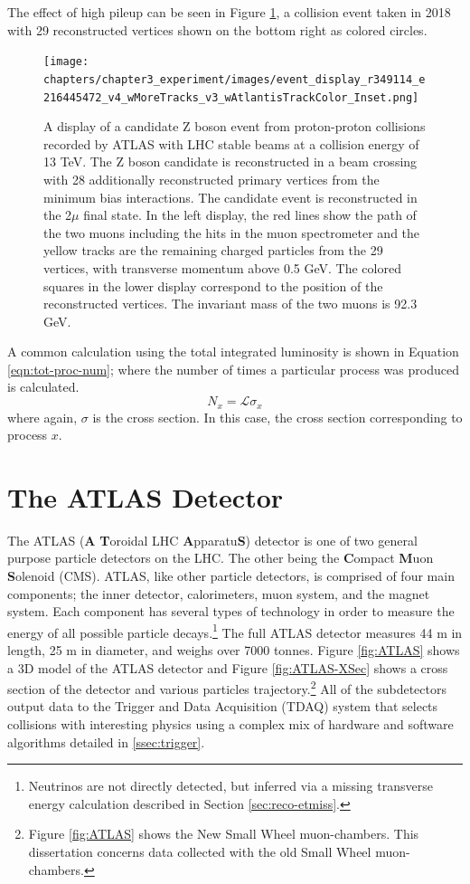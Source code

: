 		The effect of high pileup can be seen in Figure \ref{fig:high-pileup-event-display}, a collision event taken in 2018 with 29 reconstructed vertices shown on the bottom right as colored circles.
		\begin{figure}[!ht]
		\centering
		\texttt{[image: chapters/chapter3\_experiment/images/event\_display\_r349114\_e216445472\_v4\_wMoreTracks\_v3\_wAtlantisTrackColor\_Inset.png]}
		\caption{ A display of a candidate Z boson event from proton-proton collisions recorded by ATLAS with LHC stable beams at a collision energy of 13 TeV. The Z boson candidate is reconstructed in a beam crossing with 28 additionally reconstructed primary vertices from the minimum bias interactions. The candidate event is reconstructed in the 2$\mu$ final state. In the left display, the red lines show the path of the two muons including the hits in the muon spectrometer and the yellow tracks are the remaining charged particles from the 29 vertices, with transverse momentum above 0.5 GeV. The colored squares in the lower display correspond to the position of the reconstructed vertices. The invariant mass of the two muons is 92.3 GeV. }
		\label{fig:high-pileup-event-display}
		\end{figure}


		A common calculation using the total integrated luminosity is shown in Equation \ref{eqn:tot-proc-num}; where the number of times a particular process was produced is calculated.
		\begin{equation}\label{eqn:tot-proc-num}
		N_{x} = \mathcal{L} \sigma_{x}
		\end{equation}
		where again, $\sigma$ is the cross section. In this case, the cross section corresponding to process $x$.


\section{The ATLAS Detector}\label{sec:ATLAS}
	The ATLAS (\textbf{A} \textbf{T}oroidal LHC \textbf{A}pparatu\textbf{S}) detector is one of two general purpose particle detectors on the LHC. The other being the \textbf{C}ompact \textbf{M}uon \textbf{S}olenoid (CMS). ATLAS, like other particle detectors, is comprised of four main components; the inner detector, calorimeters, muon system, and the magnet system. Each component has several types of technology in order to measure the energy of all possible particle decays.\footnote{Neutrinos are not directly detected, but inferred via a missing transverse energy calculation described in Section \ref{sec:reco-etmiss}.} The full ATLAS detector measures 44 m in length, 25 m in diameter, and weighs over 7000 tonnes. Figure \ref{fig:ATLAS} shows a 3D model of the ATLAS detector and Figure \ref{fig:ATLAS-XSec} shows a cross section of the detector and various particles trajectory.\footnote{Figure \ref{fig:ATLAS} shows the New Small Wheel muon-chambers. This dissertation concerns data collected with the old Small Wheel muon-chambers.} All of the subdetectors output data to the Trigger and Data Acquisition (TDAQ) system that selects collisions with interesting physics using a complex mix of hardware and software algorithms detailed in \ref{ssec:trigger}. 


